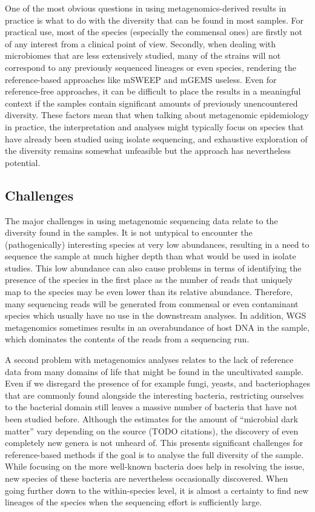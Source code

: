 \documentclass[officiallayout]{tktla}
\begin{document}
One of the most obvious questions in using metagenomics-derived
results in practice is what to do with the diversity that can be found
in most samples. For practical use, most of the species (especially
the commensal ones) are firstly not of any interest from a clinical
point of view. Secondly, when dealing with microbiomes that are less
extensively studied, many of the strains will not correspond to any
previously sequenced lineages or even species, rendering the
reference-based approaches like mSWEEP and mGEMS useless. Even for
reference-free approaches, it can be difficult to place the results in
a meaningful context if the samples contain significant amounts of
previously unencountered diversity. These factors mean that when
talking about metagenomic epidemiology in practice, the interpretation
and analyses might typically focus on species that have already been
studied using isolate sequencing, and exhaustive exploration of the
diversity remains somewhat unfeasible but the approach has
nevertheless potential.

\subsection{Challenges}
The major challenges in using metagenomic sequencing data relate to
the diversity found in the samples. It is not untypical to encounter
the (pathogenically) interesting species at very low abundances,
resulting in a need to sequence the sample at much higher depth than
what would be used in isolate studies. This low abundance can also
cause problems in terms of identifying the presence of the species in
the first place as the number of reads that uniquely map to the
species may be even lower than its relative abundance. Therefore, many
sequencing reads will be generated from commensal or even contaminant
species which usually have no use in the downstream analyses. In
addition, WGS metagenomics sometimes results in an overabundance of
host DNA in the sample, which dominates the contents of the reads from
a sequencing run.

A second problem with metagenomics analyses relates to the lack of
reference data from many domains of life that might be found in the
uncultivated sample. Even if we disregard the presence of for example
fungi, yeasts, and bacteriophages that are commonly found alongside
the interesting bacteria, restricting ourselves to the bacterial
domain still leaves a massive number of bacteria that have not been
studied before. Although the estimates for the amount of ``microbial
dark matter'' vary depending on the source (TODO citations), the
discovery of even completely new genera is not unheard of. This
presents significant challenges for reference-based methods if the
goal is to analyse the full diversity of the sample. While focusing on
the more well-known bacteria does help in resolving the issue, new
species of these bacteria are nevertheless occasionally
discovered. When going further down to the within-species level, it is
almost a certainty to find new lineages of the species when the
sequencing effort is sufficiently large.
\end{document}
